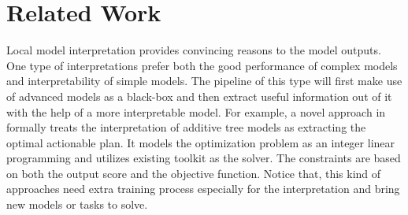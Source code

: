 \section{Related Work}\label{secrel}

Local model interpretation provides convincing reasons to the model outputs.
One type of interpretations prefer both the good performance of complex models and
interpretability of simple models. The pipeline of this type will first make use of
advanced models as a black-box and then extract useful information out of it with
the help of a more interpretable model. For example,
a novel approach in \cite{cui2015optimal} 
formally treats the interpretation of additive tree models as extracting 
the optimal actionable plan. It models the optimization problem as 
an integer linear programming and utilizes existing toolkit as the solver.
The constraints are based on both the output score and the objective function. 
Notice that, %
this kind of approaches need extra training process especially 
for the interpretation and bring new models or tasks to solve.

